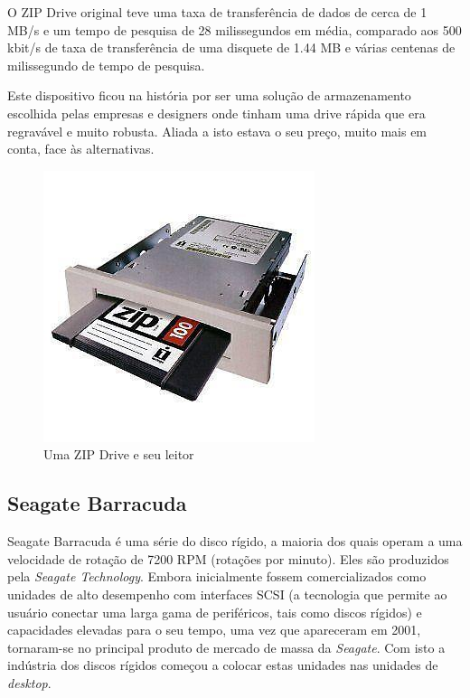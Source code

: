 \documentclass{report}
\begin{document}
	O ZIP Drive original teve uma taxa de transferência de dados de cerca de 1 MB/s e um tempo de pesquisa de 28 milissegundos em média, comparado aos 500 kbit/s de taxa de transferência de uma disquete de 1.44 MB e várias centenas de milissegundo de tempo de pesquisa.
\vspace{1mm}

	Este dispositivo ficou na história por ser uma solução de armazenamento escolhida pelas empresas e designers onde tinham uma drive rápida que era regravável e muito robusta. Aliada a isto estava o seu preço, muito mais em conta, face às alternativas.
\vspace{1mm}
	
	\begin{figure} [h]
		\centering
		\includegraphics[scale=0.5]{zipdrive.jpg}
		\caption{Uma ZIP Drive e seu leitor}
	\end{figure}
	
\newpage

	\subsection{Seagate Barracuda}

	Seagate Barracuda é uma série do disco rígido, a maioria dos quais operam a uma velocidade de rotação de 7200 RPM (rotações por minuto). Eles são produzidos pela \textit{Seagate Technology}. Embora inicialmente fossem comercializados como unidades de alto desempenho com interfaces SCSI (a tecnologia que permite ao usuário conectar uma larga gama de periféricos, tais como discos rígidos) e capacidades elevadas para o seu tempo, uma vez que apareceram em 2001, tornaram-se no principal produto de mercado de massa da \textit{Seagate}. Com isto a indústria dos discos rígidos começou a colocar estas unidades nas unidades de \textit{desktop}.
\vspace{1mm}
\end{document}
